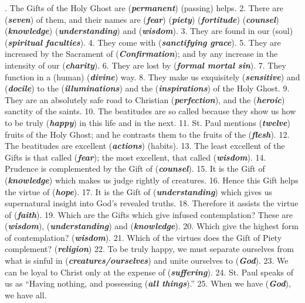\documentclass[a4paper]{article}
\begin{document}
. The Gifts of the Holy Ghost are (\textbf{\textit{permanent}}) (passing) helps. 2. There are (\textbf{\textit{seven}}) of them, and their names are (\textbf{\textit{fear}}) (\textbf{\textit{piety}}) (\textbf{\textit{fortitude}}) (\textbf{\textit{counsel}}) (\textbf{\textit{knowledge}}) (\textbf{\textit{understanding}}) and (\textbf{\textit{wisdom}}). 3. They are found in our (soul) (\textbf{\textit{spiritual faculties}}). 4. They come with (\textbf{\textit{sanctifying grace}}). 5. They are increased by the Sacrament of (\textbf{\textit{Confirmation}}); and by any increase in the intensity of our (\textbf{\textit{charity}}). 6. They are lost by (\textbf{\textit{formal mortal sin}}). 7. They function in a (human) (\textbf{\textit{divine}}) way. 8. They make us exquisitely (\textbf{\textit{sensitive}}) and (\textbf{\textit{docile}}) to the (\textbf{\textit{illuminations}}) and the (\textbf{\textit{inspirations}}) of the Holy Ghost. 9. They are an absolutely safe road to Christian (\textbf{\textit{perfection}}), and the (\textbf{\textit{heroic}}) sanctity of the saints. 10. The beatitudes are so called because they show us how to be truly (\textbf{\textit{happy}}) in this life and in the next. 11. St. Paul mentions (\textbf{\textit{twelve}}) fruits of the Holy Ghost; and he contrasts them to the fruits of the (\textbf{\textit{flesh}}). 12. The beatitudes are excellent (\textbf{\textit{actions}}) (habits). 13. The least excellent of the Gifts is that called (\textbf{\textit{fear}}); the most excellent, that called (\textbf{\textit{wisdom}}). 14. Prudence is complemented by the Gift of (\textbf{\textit{counsel}}). 15. It is the Gift of (\textbf{\textit{knowledge}}) which makes us judge rightly of creatures. 16. Hence this Gift helps the virtue of (\textbf{\textit{hope}}). 17. It is the Gift of (\textbf{\textit{understanding}}) which gives us supernatural insight into God's revealed truths. 18. Therefore it assists the virtue of (\textbf{\textit{faith}}). 19. Which are the Gifts which give infused contemplation? These are (\textbf{\textit{wisdom}}), (\textbf{\textit{understanding}}) and (\textbf{\textit{knowledge}}). 20. Which give the highest form of contemplation? (\textbf{\textit{wisdom}}). 21. Which of the virtues does the Gift of Piety complement? (\textbf{\textit{religion}}) 22. To be truly happy, we must separate ourselves from what is sinful in (\textbf{\textit{creatures/ourselves}}) and unite ourselves to (\textbf{\textit{God}}). 23. We can be loyal to Christ only at the expense of (\textbf{\textit{suffering}}). 24. St. Paul speaks of us as ``Having nothing, and possessing (\textbf{\textit{all things}}).'' 25. When we have (\textbf{\textit{God}}), we have all.
\end{document}
